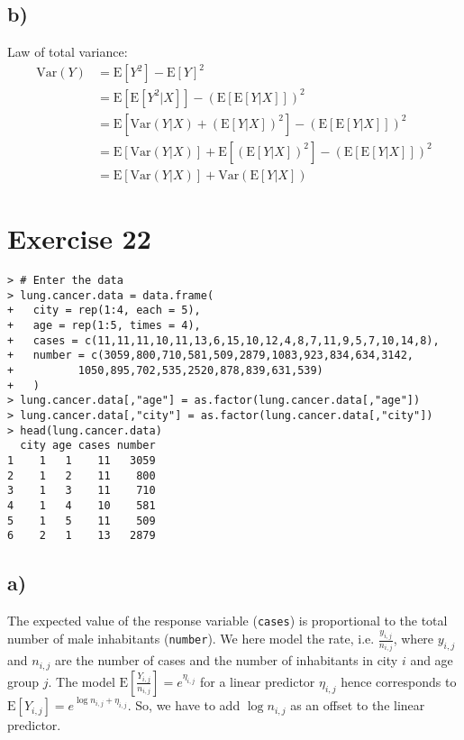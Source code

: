 \documentclass[a4paper]{article}
\newcommand{\E}{\mathrm{E}}
\newcommand{\Var}{\mathrm{Var}}
\begin{document}
\vspace{\baselineskip}
\subsection{b)}
Law of total variance:
\begin{align*}
\Var(Y) &= \E\left[Y^{2}\right] - \E\left[Y\right]^{2}\\
&= \E\left[\E\left[Y^{2}|X\right]\right] - \left(\E\left[\E\left[Y|X\right]\right]\right)^{2}\\
&= \E\left[\Var\left(Y|X\right) + \left(\E\left[Y|X\right]\right)^{2}\right] - \left(\E\left[\E\left[Y|X\right]\right]\right)^{2}\\
&= \E\left[\Var\left(Y|X\right)\right] + \E\left[\left(\E\left[Y|X\right]\right)^{2}\right] - \left(\E\left[\E\left[Y|X\right]\right]\right)^{2}\\
&= \E\left[\Var\left(Y|X\right)\right] + \Var\left(\E\left[Y|X\right]\right)
\end{align*}


\vspace{\baselineskip}
\section{Exercise 22}

\begin{lstlisting}
> # Enter the data
> lung.cancer.data = data.frame(
+   city = rep(1:4, each = 5),
+   age = rep(1:5, times = 4),
+   cases = c(11,11,11,10,11,13,6,15,10,12,4,8,7,11,9,5,7,10,14,8),
+   number = c(3059,800,710,581,509,2879,1083,923,834,634,3142,
+          1050,895,702,535,2520,878,839,631,539)
+   )
> lung.cancer.data[,"age"] = as.factor(lung.cancer.data[,"age"])
> lung.cancer.data[,"city"] = as.factor(lung.cancer.data[,"city"])
> head(lung.cancer.data)
  city age cases number
1    1   1    11   3059
2    1   2    11    800
3    1   3    11    710
4    1   4    10    581
5    1   5    11    509
6    2   1    13   2879
\end{lstlisting}


\subsection{a)}
The expected value of the response variable (\texttt{cases}) is proportional to the total number of male inhabitants (\texttt{number}). We here model the rate, i.e. $\frac{y_{i,j}}{n_{i,j}}$, where $y_{i,j}$ and $n_{i,j}$ are the number of cases and the number of inhabitants in city $i$ and age group $j$. The model $\E\left[\frac{Y_{i,j}}{n_{i,j}}\right] = e^{\eta_{i,j}}$ for a linear predictor $\eta_{i,j}$ hence corresponds to $\E\left[Y_{i,j}\right] = e^{\log n_{i,j} + \eta_{i,j}}$. So, we have to add $\log n_{i,j}$ as an offset to the linear predictor.
\end{document}
